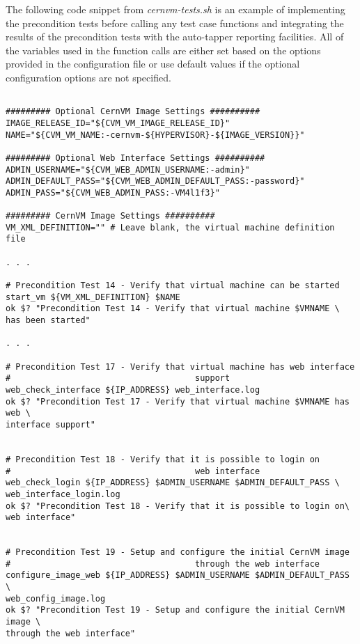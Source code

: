 \begin{enumerate}
			The following code snippet from \emph{cernvm-tests.sh} is an example of implementing the precondition tests
			before calling any test case functions and integrating the results of the precondition tests with the auto-tapper
			reporting facilities. All of the variables used in the function calls are either set based on the options provided in
			the configuration file or use default values if the optional configuration options are not specified.

\lstset{language=bash,caption=Adding Precondition Tests and Integrating with Tapper-AutoReport}
\begin{lstlisting}

######### Optional CernVM Image Settings ##########
IMAGE_RELEASE_ID="${CVM_VM_IMAGE_RELEASE_ID}"
NAME="${CVM_VM_NAME:-cernvm-${HYPERVISOR}-${IMAGE_VERSION}}"

######### Optional Web Interface Settings ##########
ADMIN_USERNAME="${CVM_WEB_ADMIN_USERNAME:-admin}"
ADMIN_DEFAULT_PASS="${CVM_WEB_ADMIN_DEFAULT_PASS:-password}"
ADMIN_PASS="${CVM_WEB_ADMIN_PASS:-VM4l1f3}"

######### CernVM Image Settings ##########
VM_XML_DEFINITION="" # Leave blank, the virtual machine definition file

. . .

# Precondition Test 14 - Verify that virtual machine can be started
start_vm ${VM_XML_DEFINITION} $NAME
ok $? "Precondition Test 14 - Verify that virtual machine $VMNAME \
has been started"

. . .

# Precondition Test 17 - Verify that virtual machine has web interface
#                                     support
web_check_interface ${IP_ADDRESS} web_interface.log
ok $? "Precondition Test 17 - Verify that virtual machine $VMNAME has web \
interface support"


# Precondition Test 18 - Verify that it is possible to login on
#                                     web interface
web_check_login ${IP_ADDRESS} $ADMIN_USERNAME $ADMIN_DEFAULT_PASS \
web_interface_login.log
ok $? "Precondition Test 18 - Verify that it is possible to login on\
web interface"


# Precondition Test 19 - Setup and configure the initial CernVM image 
#                                     through the web interface
configure_image_web ${IP_ADDRESS} $ADMIN_USERNAME $ADMIN_DEFAULT_PASS \
web_config_image.log
ok $? "Precondition Test 19 - Setup and configure the initial CernVM image \
through the web interface"
\end{lstlisting}


\end{enumerate}
